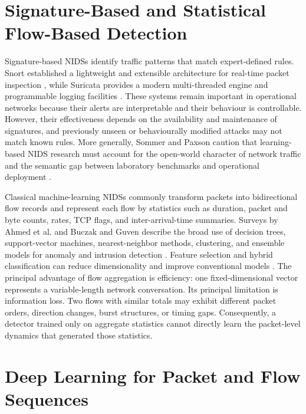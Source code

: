 \documentclass[11pt,fleqn]{report}
\begin{document}
\section{Signature-Based and Statistical Flow-Based Detection}
\label{subsec:rw_signature_flow}

Signature-based NIDSs identify traffic patterns that match expert-defined rules. Snort established a lightweight and extensible architecture for real-time packet inspection \cite{Roesch1999}, while Suricata provides a modern multi-threaded engine and programmable logging facilities \cite{SuricataGuide2026}. These systems remain important in operational networks because their alerts are interpretable and their behaviour is controllable. However, their effectiveness depends on the availability and maintenance of signatures, and previously unseen or behaviourally modified attacks may not match known rules. More generally, Sommer and Paxson caution that learning-based NIDS research must account for the open-world character of network traffic and the semantic gap between laboratory benchmarks and operational deployment \cite{SommerPaxson2010}.

Classical machine-learning NIDSs commonly transform packets into bidirectional flow records and represent each flow by statistics such as duration, packet and byte counts, rates, TCP flags, and inter-arrival-time summaries. Surveys by Ahmed et al. and Buczak and Guven describe the broad use of decision trees, support-vector machines, nearest-neighbor methods, clustering, and ensemble models for anomaly and intrusion detection \cite{Ahmed2016Survey,BuczakGuven2016}. Feature selection and hybrid classification can reduce dimensionality and improve conventional models \cite{Aljawarneh2018}. The principal advantage of flow aggregation is efficiency: one fixed-dimensional vector represents a variable-length network conversation. Its principal limitation is information loss. Two flows with similar totals may exhibit different packet orders, direction changes, burst structures, or timing gaps. Consequently, a detector trained only on aggregate statistics cannot directly learn the packet-level dynamics that generated those statistics.

\section{Deep Learning for Packet and Flow Sequences}
\label{subsec:rw_deep_sequences}
\end{document}
